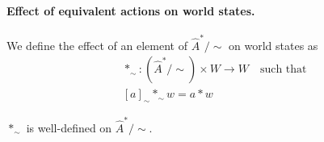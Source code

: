 \paragraph{Effect of equivalent actions on world states.}
We define the effect of an element of  $\hat{A}^{\ast}/\sim$ on world states as
\begin{equation}
    \begin{aligned}
         & \ast_{\sim}: (\hat{A}^{\ast}/\sim) \times W \to W \quad \text{such that} \\
         & [a]_{\sim} \ast_{\sim} w = a \ast w
    \end{aligned}
\end{equation}

\begin{proposition}
    $\ast_{\sim}$ is well-defined on $\hat{A}^{\ast}/\sim$.
\end{proposition}
